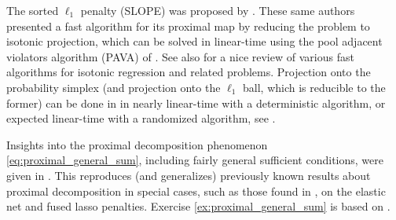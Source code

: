 The sorted $\ell_1$ penalty (SLOPE) was proposed by \cite{bogdan2015slope}. 
These same authors presented a fast algorithm for its proximal map by reducing
the problem to isotonic projection, which can be solved in linear-time using the
pool adjacent violators algorithm (PAVA) of \cite{barlow1972statistical}. See
also \cite{deleeuw2010isotonic} for a nice review of various fast algorithms for
isotonic regression and related problems. Projection onto the probability
simplex (and projection onto the $\ell_1$ ball, which is reducible to the
former) can be done in in nearly linear-time with a deterministic algorithm, or
expected linear-time with a randomized algorithm, see \cite{duchi2008efficient, 
  condat2016fast}.   

Insights into the proximal decomposition phenomenon
\eqref{eq:proximal_general_sum}, including fairly general sufficient conditions,
were given in \cite{yu2013decomposing}. This reproduces (and generalizes)
previously known results about proximal decomposition in special cases, such as 
those found in \cite{friedman2007pathwise}, on the elastic net and fused lasso 
penalties. Exercise \ref{ex:proximal_general_sum} is based on
\cite{yu2013decomposing}.     

\clearpage

